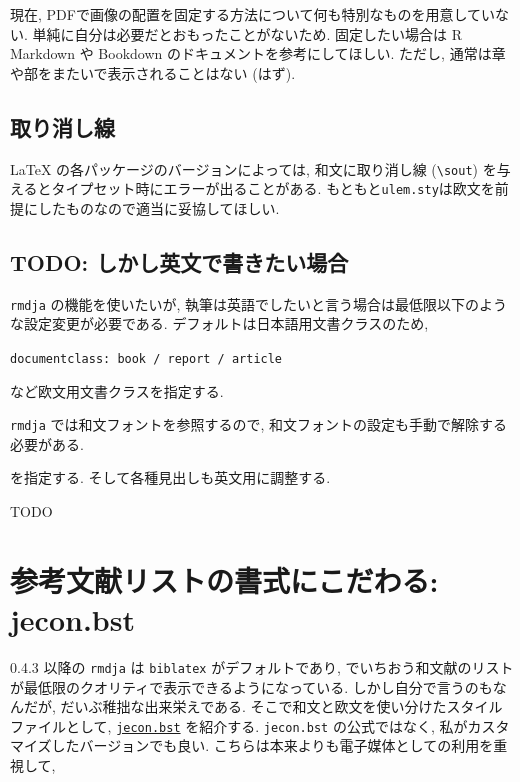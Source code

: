 \documentclass[
]{bxjsbook}
\theoremstyle{definition}
\theoremstyle{definition}
\theoremstyle{definition}
\theoremstyle{remark}
\begin{document}
現在,
PDFで画像の配置を固定する方法について何も特別なものを用意していない.
単純に自分は必要だとおもったことがないため. 固定したい場合は R Markdown
や Bookdown のドキュメントを参考にしてほしい. ただし,
通常は章や部をまたいで表示されることはない (はず).

\hypertarget{ux53d6ux308aux6d88ux3057ux7dda}{%
\section{取り消し線}\label{ux53d6ux308aux6d88ux3057ux7dda}}

LaTeX の各パッケージのバージョンによっては, 和文に取り消し線
(\texttt{\textbackslash{}sout})
を与えるとタイプセット時にエラーが出ることがある.
もともと\texttt{ulem.sty}は欧文を前提にしたものなので適当に妥協してほしい.

\hypertarget{todo-ux3057ux304bux3057ux82f1ux6587ux3067ux66f8ux304dux305fux3044ux5834ux5408}{%
\section{TODO:
しかし英文で書きたい場合}\label{todo-ux3057ux304bux3057ux82f1ux6587ux3067ux66f8ux304dux305fux3044ux5834ux5408}}

\texttt{rmdja} の機能を使いたいが,
執筆は英語でしたいと言う場合は最低限以下のような設定変更が必要である.
デフォルトは日本語用文書クラスのため,

\texttt{documentclass:\ book\ /\ report\ /\ article}

など欧文用文書クラスを指定する.

\texttt{rmdja} では和文フォントを参照するので,
和文フォントの設定も手動で解除する必要がある.

を指定する. そして各種見出しも英文用に調整する.

TODO

\hypertarget{ux53c2ux8003ux6587ux732eux30eaux30b9ux30c8ux306eux66f8ux5f0fux306bux3053ux3060ux308fux308b-jecon.bst}{%
\chapter{参考文献リストの書式にこだわる:
jecon.bst}\label{ux53c2ux8003ux6587ux732eux30eaux30b9ux30c8ux306eux66f8ux5f0fux306bux3053ux3060ux308fux308b-jecon.bst}}

0.4.3 以降の \texttt{rmdja} は \texttt{biblatex} がデフォルトであり,
でいちおう和文献のリストが最低限のクオリティで表示できるようになっている.
しかし自分で言うのもなんだが, だいぶ稚拙な出来栄えである.
そこで和文と欧文を使い分けたスタイルファイルとして,
\href{https://github.com/ShiroTakeda/jecon-bst}{\texttt{jecon.bst}}
を紹介する. \texttt{jecon.bst} の公式ではなく,
私がカスタマイズしたバージョンでも良い.
こちらは本来よりも電子媒体としての利用を重視して,
\end{document}
